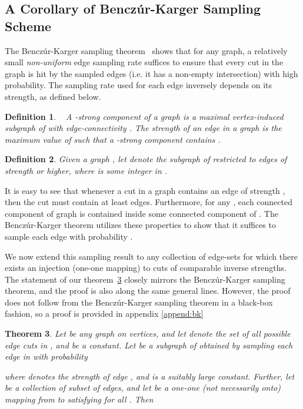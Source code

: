 \documentclass[11pt]{article}
\newtheorem{theorem}{Theorem}[section]
\newtheorem{definition}[theorem]{Definition}
\begin{document}
\subsection{A Corollary of Bencz\'{u}r-Karger Sampling Scheme}

The Bencz\'{u}r-Karger sampling theorem~\cite{benczurkarger96} shows that for any
graph, a relatively small {\em non-uniform} edge sampling rate suffices to
ensure that every cut in the graph is hit by the sampled edges (i.e. it has a non-empty intersection)
with high probability. The sampling rate used for each edge  inversely
depends on its strength, as defined below.

\label{sec:benczur-karger}
\begin{definition}~\cite{benczurkarger96} A -strong component of a graph
   is a maximal vertex-induced subgraph of  with edge-connectivity .  The
  strength of an edge  in a graph  is the maximum value of  such that
  a -strong component contains .
\end{definition}
\begin{definition}
  Given a graph , let  denote the subgraph of 
  restricted to edges of strength  or higher, where  is some integer in
  .
\end{definition}

It is easy to see that whenever a cut in a graph  contains an edge of strength ,
then the cut must contain at least  edges. Furthermore, for any , each connected
component of graph  is contained inside some connected component of .
The Bencz\'{u}r-Karger theorem utilizes these properties to show that it suffices to sample
each edge  with probability .

We now extend this sampling result to any collection of edge-sets for which there exists an injection
(one-one mapping) to cuts of comparable inverse strengths. The statement
of our theorem~\ref{thm:Benczur-Karger} closely mirrors the Bencz\'{u}r-Karger
sampling theorem, and the proof is also along the same general lines. However, the proof does not follow from the Bencz\'{u}r-Karger sampling theorem in a black-box fashion, so a proof is provided in appendix \ref{append:bk}
\begin{theorem}
\label{thm:Benczur-Karger}
Let  be any graph on  vertices, and let  denote the set
of all possible edge cuts in , and  be a constant. Let
 be a subgraph of  obtained by sampling each edge  in  with
probability

where  denotes the strength of edge , and  is a suitably large
constant. Further, let  be a collection of subset of edges, and let 
be a one-one (not necessarily onto) mapping from  to 
satisfying  for all . Then

\end{theorem}
\end{document}
